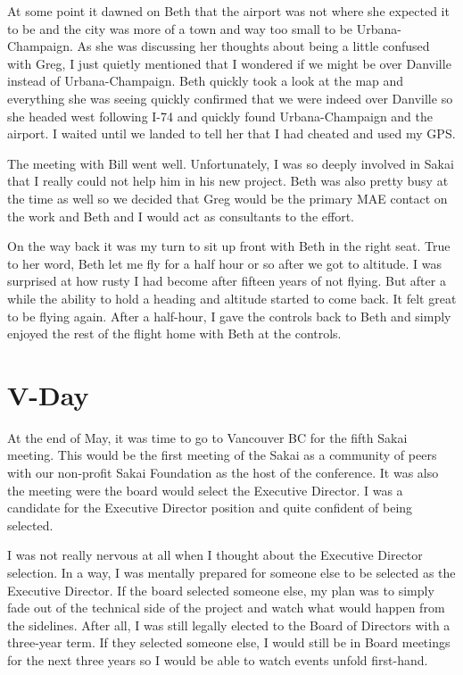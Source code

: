 \documentclass[12pt]{book}
\begin{document}
At some point it dawned on Beth that
the airport was not where she expected it to be and the city was
more of a town and way too small to be Urbana-Champaign.  As she was
discussing her thoughts about being a little confused with Greg, I just
quietly mentioned that I wondered if we might be over
Danville instead of Urbana-Champaign.  Beth quickly took a look
at the map and everything she was seeing quickly confirmed that
we were indeed over Danville so she headed west following I-74
and quickly found Urbana-Champaign and the airport.  I waited
until we landed to tell her that I had cheated and used my GPS.

The meeting with Bill went well.  Unfortunately, I was so deeply
involved in Sakai that I really could not help him in his new project.
Beth was also pretty busy at the time as well so we decided that
Greg would be the primary MAE contact on the work and Beth and
I would act as consultants to the effort.

On the way back it was my turn to sit up front with Beth in the right seat.
True to her word, Beth let me fly for a half hour or so after we
got to altitude.  I was surprised at how rusty I had become after fifteen
years of not flying.  But after a while the ability to hold a heading and
altitude started to come back.   It felt great to be flying again.
After a half-hour, I gave the controls back to Beth and simply enjoyed the
rest of the flight home with Beth at the controls.

\chapter{V-Day}

At the end of May, it was time to go to Vancouver BC for the fifth Sakai
meeting.  This would be the first meeting of the Sakai as a community
of peers with our non-profit Sakai Foundation as the host of
the conference.  It was also the meeting were the board would select the
Executive Director.  I was a candidate for the Executive Director position
and quite confident of being selected.

I was not really nervous at all when I
thought about the Executive Director selection.  In a way, I
was mentally prepared for someone else to be selected as the Executive Director.
If the board selected someone else, my plan was to simply fade out of the
technical side of the project and watch what would happen from the
sidelines.  After all, I was still legally elected to the
Board of Directors with a three-year term.  If they selected someone
else, I would still be in Board meetings for the next
three years so I would be able to watch events unfold first-hand.
\end{document}
